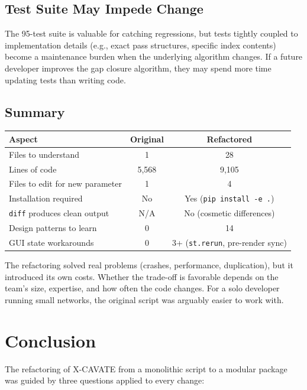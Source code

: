 \documentclass[11pt,a4paper]{article}
\begin{document}
\subsection{Test Suite May Impede Change}

The 95-test suite is valuable for catching regressions, but tests tightly coupled to implementation details (e.g., exact pass structures, specific index contents) become a maintenance burden when the underlying algorithm changes. If a future developer improves the gap closure algorithm, they may spend more time updating tests than writing code.

\subsection{Summary}

\begin{center}
\begin{tabular}{lcc}
\toprule
\textbf{Aspect} & \textbf{Original} & \textbf{Refactored} \\
\midrule
Files to understand & 1 & 28 \\
Lines of code & 5,568 & 9,105 \\
Files to edit for new parameter & 1 & 4 \\
Installation required & No & Yes (\texttt{pip install -e .}) \\
\texttt{diff} produces clean output & N/A & No (cosmetic differences) \\
Design patterns to learn & 0 & 14 \\
GUI state workarounds & 0 & 3+ (\texttt{st.rerun}, pre-render sync) \\
\bottomrule
\end{tabular}
\end{center}

The refactoring solved real problems (crashes, performance, duplication), but it introduced its own costs. Whether the trade-off is favorable depends on the team's size, expertise, and how often the code changes. For a solo developer running small networks, the original script was arguably easier to work with.


\section{Conclusion}

The refactoring of X-CAVATE from a monolithic script to a modular package was guided by three questions applied to every change:
\end{document}
